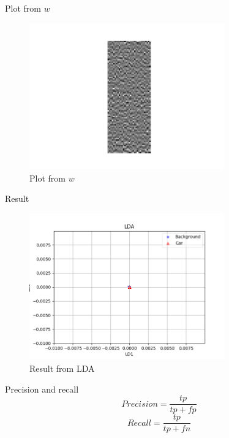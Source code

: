 \documentclass[handout]{beamer}
\begin{document}
\begin{frame}{Plot from $w$}
    {\centering
    \begin{figure}[H]
        \includegraphics[width=0.75\textwidth]{project_03/ww.png}
        \caption{Plot from $w$}
    \end{figure}
    }
\end{frame}

\begin{frame}{Result}
    {\centering
    \begin{figure}[H]
        \includegraphics[width=0.75\textwidth]{project_03/lda.png}
        \caption{Result from LDA}
    \end{figure}
    }
\end{frame}

\begin{frame}{Precision and recall}
\Huge
\begin{equation}
    Precision = \frac{tp}{tp + fp}
\end{equation}
\begin{equation}
    Recall = \frac{tp}{tp + fn}
\end{equation}
\end{frame}
\end{document}
